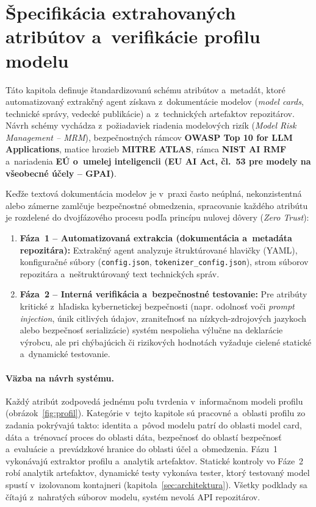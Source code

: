 \clearpage
\section{Špecifikácia extrahovaných atribútov a~verifikácie profilu modelu}
\label{sec:specifikacia-atributov}

Táto kapitola definuje štandardizovanú schému atribútov a~metadát, ktoré
automatizovaný extrakčný agent získava z~dokumentácie modelov (\emph{model
cards}, technické správy, vedecké publikácie) a~z~technických artefaktov
repozitárov. Návrh schémy vychádza z~požiadaviek riadenia modelových rizík
(\emph{Model Risk Management -- MRM}), bezpečnostných rámcov \textbf{OWASP Top
10 for LLM Applications}, matice hrozieb \textbf{MITRE ATLAS}, rámca
\textbf{NIST AI RMF} a~nariadenia \textbf{EÚ o~umelej inteligencii (EU AI Act,
čl.~53 pre modely na všeobecné účely -- GPAI)}.

Keďže textová dokumentácia modelov je v~praxi často neúplná, nekonzistentná
alebo zámerne zamlčuje bezpečnostné obmedzenia, spracovanie každého atribútu je
rozdelené do dvojfázového procesu podľa princípu nulovej dôvery (\emph{Zero
Trust}):
\begin{enumerate}
    \item \textbf{Fáza~1 -- Automatizovaná extrakcia (dokumentácia a~metadáta
    repozitára):} Extrakčný agent analyzuje štruktúrované hlavičky (YAML),
    konfiguračné súbory (\texttt{config.json}, \texttt{tokenizer\_config.json}),
    strom súborov repozitára a~neštruktúrovaný text technických správ.
    \item \textbf{Fáza~2 -- Interná verifikácia a~bezpečnostné testovanie:} Pre
    atribúty kritické z~hľadiska kybernetickej bezpečnosti (napr. odolnosť voči
    \emph{prompt injection}, únik citlivých údajov, zraniteľnosť na
    nízkych-zdrojových jazykoch alebo bezpečnosť serializácie) systém
    nespolieha výlučne na deklarácie výrobcu, ale pri chýbajúcich či rizikových
    hodnotách vyžaduje cielené statické a~dynamické testovanie.
\end{enumerate}

\paragraph{Väzba na návrh systému.} Každý atribút zodpovedá jednému poľu
tvrdenia v~informačnom modeli profilu (obrázok~\ref{fig:profil}). Kategórie
v~tejto kapitole sú pracovné a~oblasti profilu zo zadania pokrývajú takto:
identita a~pôvod modelu patrí do oblasti model card, dáta a~trénovací proces
do oblasti dáta, bezpečnosť do oblastí bezpečnosť a~evaluácie a~prevádzkové
hranice do oblasti účel a~obmedzenia. Fázu~1 vykonávajú extraktor profilu
a~analytik artefaktov. Statické kontroly vo Fáze~2 robí analytik artefaktov,
dynamické testy vykonáva tester, ktorý testovaný model spustí v~izolovanom
kontajneri (kapitola~\ref{sec:architektura}). Všetky podklady sa čítajú
z~nahratých súborov modelu, systém nevolá API repozitárov.

